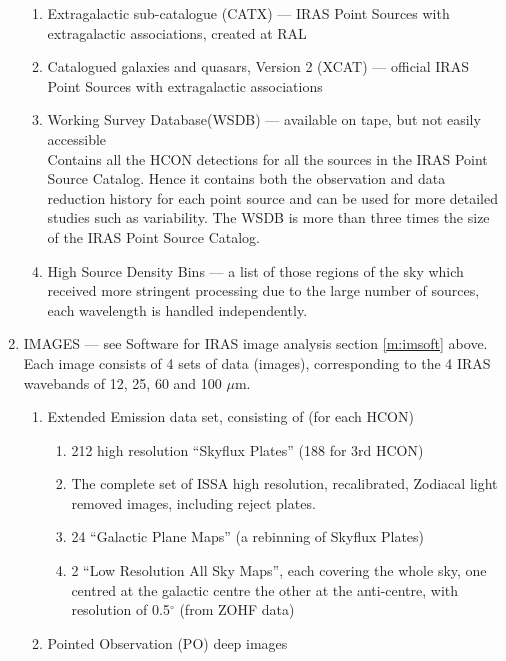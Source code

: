 \begin{enumerate}
\begin{enumerate}
	\item Extragalactic sub-catalogue (CATX) --- IRAS Point Sources with
              extragalactic associations, created at RAL
        \item Catalogued galaxies and quasars, Version 2 (XCAT) --- official 
              IRAS Point Sources with extragalactic associations
	\item Working Survey Database(WSDB) --- available on tape, but not 
              easily accessible\\
              Contains all the HCON detections for all the sources in the 
              IRAS Point Source Catalog.
              Hence it contains both the observation and data reduction 
              history for each point source and can be used for more detailed 
              studies such as variability.
	      The WSDB is more than three times the size of the IRAS Point 
              Source Catalog.
	\item High Source Density Bins --- a list of those regions of the sky
              which received more stringent processing due to the large number
              of sources, each wavelength is handled independently.
	\end{enumerate}
\item IMAGES --- see Software for IRAS image analysis section \ref{m:imsoft}
above.
	Each image consists of 4 sets of data (images), 
	corresponding to the 4 IRAS 
	wavebands of 12, 25, 60 and 100 $\mu$m.
	\begin{enumerate}
	\item Extended Emission data set, consisting of (for each HCON)\\
		\begin{enumerate}
		\item 212 high resolution ``Skyflux Plates'' (188 for 3rd HCON)
                \item The complete set of ISSA high resolution, recalibrated,
                Zodiacal light removed images, including reject plates.
		\item 24 ``Galactic Plane Maps'' (a rebinning of Skyflux Plates)
		\item 2 ``Low Resolution All Sky Maps'', each covering the 
		whole sky, one centred at the galactic centre the other 
		at the anti-centre, with resolution of 0.5$^{\circ}$ (from
                ZOHF data)
		\end{enumerate}
	\item Pointed Observation (PO) deep images\\

\end{enumerate}
\end{enumerate}
